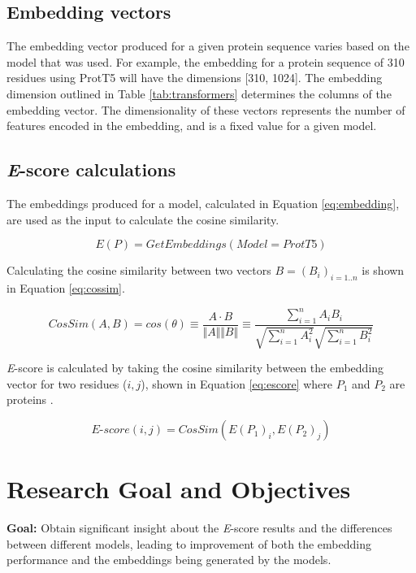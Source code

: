\documentclass[
	letterpaper, %
	10pt, %
]{journalArticle}
\begin{document}
\subsection{Embedding vectors}
The embedding vector produced for a given protein sequence varies based on the model that was used. For example, the embedding for a protein sequence of 310 residues using ProtT5 will have the dimensions [310, 1024]. The embedding dimension outlined in Table \ref{tab:transformers} determines the columns of the embedding vector. The dimensionality of these vectors represents the number of features encoded in the embedding, and is a fixed value for a given model.

\subsection{\textit{E}-score calculations}
The embeddings produced for a model, calculated in Equation \ref{eq:embedding}, are used as the input to calculate the cosine similarity.

\begin{equation}
    E(P) = GetEmbeddings(Model = ProtT5)
    \label{eq:embedding}
\end{equation}

Calculating the cosine similarity between two vectors \(B = (B_i)_{i=1..n}\) is shown in Equation \ref{eq:cossim}.

\begin{equation}
	CosSim(A, B) = cos(\theta) \equiv \frac{A \cdot B}{\Vert A \Vert \Vert B \Vert} \equiv \frac{\sum\limits_{i=1}^{n} A_iB_i}{\sqrt{\sum\limits_{i=1}^{n} A_i^2}\sqrt{\sum\limits_{i=1}^{n} B_i^2}}
	\label{eq:cossim}
\end{equation}

\textit{E}-score is calculated by taking the cosine similarity between the embedding vector for two residues (\(i, j\)), shown in Equation \ref{eq:escore} where \(P_1\) and \(P_2\) are proteins \autocite{Ashrafzadeh:2023}.

\begin{equation}
    \textit{E}\mbox{-}score(i,j) = CosSim(E(P_1)_i, E(P_2)_j)
    \label{eq:escore}
\end{equation}

\section{Research Goal and Objectives}
\textbf{Goal: }Obtain significant insight about the \textit{E}-score results and the differences between different models, leading to improvement of both the embedding performance and the embeddings being generated by the models.
\end{document}
